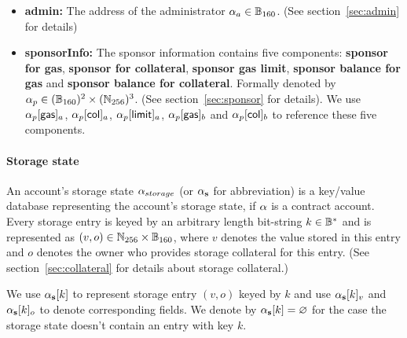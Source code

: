 \begin{itemize}[nosep]
	\item {\bf admin:} The address of the administrator $\mathbf{\alpha}_a\in \mathbb{B}_{160}$. (See section~\ref{sec:admin} for details)
	
	\item {\bf sponsorInfo:} The sponsor information contains five components: {\bf sponsor for gas}, {\bf sponsor for collateral}, {\bf sponsor gas limit}, {\bf sponsor balance for gas} and {\bf sponsor balance for collateral}. Formally denoted by $\mathbf{\alpha}_p\in (\mathbb{B}_{160})^2\times (\mathbb{N}_{256})^3$. (See section~\ref{sec:sponsor} for details). We use $\mathbf{\alpha}_p[{\sf gas}]_a$, $\mathbf{\alpha}_p[{\sf col}]_a$, 
	$\mathbf{\alpha}_p[{\sf limit}]_a$, $\mathbf{\alpha}_p[{\sf gas}]_b$ and $\mathbf{\alpha}_p[{\sf col}]_b$ to reference these five components. 
\end{itemize}

\paragraph{Storage state}

An account's storage state $\mathbf{\alpha}_{storage}$ (or $\mathbf{\alpha}_{\bf s}$ for abbreviation) is a key/value database representing the account's storage state, if $\mathbf{\alpha}$ is a contract account. 
%
Every storage entry is keyed by an arbitrary length bit-string $k\in \mathbb{B}^{*}$ and is represented as $(v,o)\in \mathbb{N}_{256}\times \mathbb{B}_{160}$, where $v$ denotes the value stored in this entry and $o$ denotes the owner who provides storage collateral for this entry. (See section~\ref{sec:collateral} for details about storage collateral.)

We use $\mathbf{\alpha}_{\bf s}[k]$ to represent storage entry $(v,o)$ keyed by $k$ and use $\mathbf{\alpha}_{\bf s}[k]_v$ and $\mathbf{\alpha}_{\bf s}[k]_o$ to denote corresponding fields. We denote by $\mathbf{\alpha}_{\bf s}[k]=\varnothing$ for the case the storage state doesn't contain an entry with key $k$. 



